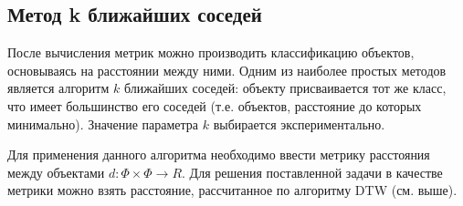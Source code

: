 \subsection{Метод k ближайших соседей}

После вычисления метрик можно производить классификацию объектов, основываясь на расстоянии между ними. Одним из наиболее простых методов является алгоритм $k$ ближайших соседей: объекту присваивается тот же класс, что имеет большинство его соседей (т.е. объектов, расстояние до которых минимально). Значение параметра $k$ выбирается экспериментально.

Для применения данного алгоритма необходимо ввести метрику расстояния между объектами $d: \Phi \times \Phi \to R$. Для решения поставленной задачи в качестве метрики можно взять расстояние, рассчитанное по алгоритму DTW (см. выше). 
